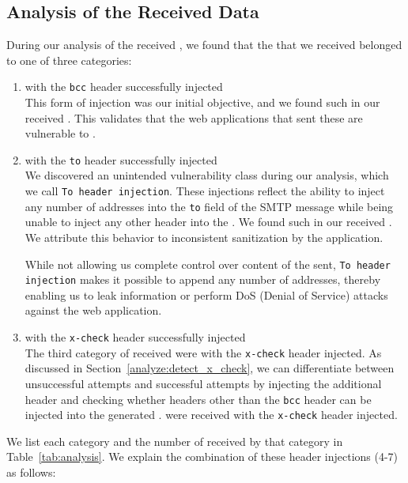 \subsection{Analysis of the Received \Email Data}
During our analysis of the received \emails, we found that the \emails that we received belonged to one of three categories:
\begin{enumerate}
	\item \Emails with the \texttt{bcc} header successfully injected\\
	  This form of injection was our initial objective, and we found
      \ehibcc such \emails in our received \emails. This validates that the web applications that sent these \emails are vulnerable to \ehi.
	
	\item \Emails with the \texttt{to} header successfully injected\\
	We discovered an unintended vulnerability class during our analysis, which we call \texttt{To~header injection}. These injections reflect the ability to inject any number of \email addresses into the \texttt{to} field of the SMTP message while being unable to inject any other header into the \emails. We found \ehito such \emails in our received \emails. We attribute this behavior to inconsistent sanitization by the application. 
	
	While not allowing us complete control over content of the \emails sent, \texttt{To header injection} makes it possible to append any number of \email addresses, thereby enabling us to leak information or perform DoS (Denial of Service) attacks against the web application.
	
	\item \Emails with the \texttt{x-check} header successfully injected\\
    The third category of \emails received were \emails with the \texttt{x-check} header injected. As discussed in Section~\ref{analyze:detect_x_check}, 
    we can differentiate between unsuccessful attempts and successful attempts by injecting the additional header and checking whether headers other than the \texttt{bcc} header can be injected into the generated \email. \ehixcheck \emails were received with the \texttt{x-check} header injected.
\end{enumerate}

We list each category and the number of \emails received by that category in Table~\ref{tab:analysis}. 
We explain the combination of these header injections (4-7) as follows:

